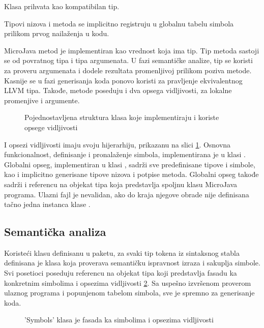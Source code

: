 Klasa  prihvata  kao kompatibilan tip.

Tipovi nizova i metoda se implicitno registruju u globalnu tabelu simbola prilikom prvog nailaženja u kodu.

MicroJava metod je implementiran kao vrednost koja ima tip.
Tip metoda sastoji se od povratnog tipa i tipa argumenata. 
U fazi semantičke analize, tip se koristi za proveru argumenata i dodele rezultata promenljivoj prilikom poziva metode.
Kasnije se u fazi generisanja koda ponovo koristi za pravljenje ekvivalentnog LLVM tipa.
Takođe, metode poseduju i dva opsega vidljivosti, za lokalne promenjive i argumente.

\begin{figure}[h]
	\centering
	
	\caption{Pojednostavljena struktura klasa koje implementiraju i koriste opsege vidljivosti}
	\label{fig:scopes} 
\end{figure}

I opsezi vidljivosti imaju svoju hijerarhiju, prikazanu na slici \ref{fig:scopes}.
Osnovna funkcionalnost, definisanje i pronalaženje simbola, implementirana je u klasi .
Globalni opseg, implementiran u klasi , sadrži sve predefinisane tipove i simbole, kao i implicitno generisane tipove nizova i potpise metoda.
Globalni opseg takođe sadrži i referencu na objekat tipa  koja predstavlja spoljnu klasu MicroJava programa.
Ulazni fajl je nevalidan, ako do kraja njegove obrade nije definisana tačno jedna instanca klase .


\subsection*{Semantička analiza}

Koristeći  klasu definisanu u  paketu, za svaki tip tokena iz sintaksnog stabla definisana je  klasa koja proverava semantičku ispravnost izraza i sakuplja simbole. 
Svi posetioci poseduju referencu na objekat tipa  koji predstavlja fasadu ka konkretnim simbolima i opsezima vidljivosti \ref{fig:symbols-facade}.
Sa uspešno izvršenom proverom ulaznog programa i popunjenom tabelom simbola, sve je spremno za generisanje koda.
\begin{figure}[h]
	\centering
	
	\caption{'Symbols' klasa je fasada ka simbolima i opsezima vidljivosti}
	\label{fig:symbols-facade}
\end{figure}


